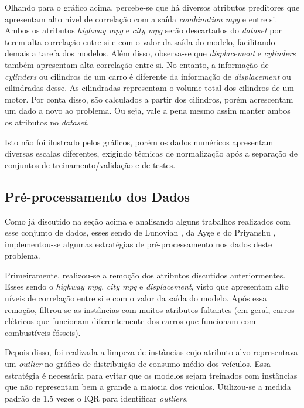 \documentclass{report}
\begin{document}
Olhando para o gráfico acima, percebe-se que há diversos atributos preditores que apresentam alto nível de correlação com a saída \textit{combination mpg} e entre si. Ambos os atributos
\textit{highway mpg} e \textit{city mpg} serão descartados do \textit{dataset} por terem alta correlação entre si e com o valor da saída do modelo, facilitando demais a tarefa dos modelos.
Além disso, observa-se que \textit{displacement} e \textit{cylinders} também apresentam alta correlação entre si. No entanto, a informação de \textit{cylinders} ou cilindros de um carro é diferente
da informação de \textit{displacement} ou cilindradas desse. As cilindradas representam o volume total dos cilindros de um motor. Por conta disso, são calculados a partir dos cilindros, porém
acrescentam um dado a novo ao problema. Ou seja, vale a pena mesmo assim manter ambos os atributos no \textit{dataset}.

Isto não foi ilustrado pelos gráficos, porém os dados numéricos apresentam diversas escalas diferentes, exigindo técnicas de normalização após a separação de conjuntos de treinamento/validação
e de testes.

\subsection{Pré-processamento dos Dados}

Como já discutido na seção acima e analisando alguns trabalhos realizados com esse conjunto de dados, esses sendo de Lunovian \cite{Lunovian}, da Ayşe \cite{Ayşe} e do Priyanshu \cite{Priyanshu},
implementou-se algumas estratégias de pré-processamento nos dados deste problema.

Primeiramente, realizou-se a remoção dos atributos discutidos anteriormentes. Esses sendo o \textit{highway mpg}, \textit{city mpg} e \textit{displacement}, visto que apresentam alto níveis de
correlação entre si e com o valor da saída do modelo. Após essa remoção, filtrou-se as instâncias com muitos atributos faltantes (em geral, carros elétricos que funcionam diferentemente dos carros
que funcionam com combustíveis fósseis).

Depois disso, foi realizada a limpeza de instâncias cujo atributo alvo representava um \textit{outlier} no gráfico de distribuição de consumo médio dos veículos. Essa estratégia é necessária para
evitar que os modelos sejam treinados com instâncias que não representam bem a grande a maioria dos veículos. Utilizou-se a medida padrão de 1.5 vezes o IQR para identificar \textit{outliers}.
\end{document}
